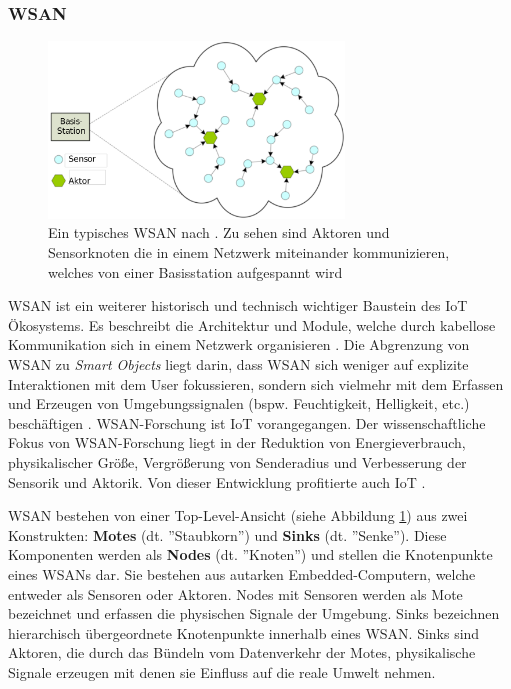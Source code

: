 \subsubsection{\acl{WSAN}}\label{subsubsec:wsan}
\begin{figure}[h]
    \centering
    \includegraphics[width=0.7\textwidth]{bilder/chapter2/wsan.pdf}
    \caption{Ein typisches \ac{WSAN} nach \cite{feng2008wsan}. Zu sehen sind Aktoren und Sensorknoten die in einem Netzwerk miteinander kommunizieren, welches von einer Basisstation aufgespannt wird}
    \label{fig:WSAN}
\end{figure}
\ac{WSAN} ist ein weiterer historisch und technisch wichtiger Baustein des \ac{IoT} Ökosystems. Es beschreibt die Architektur und Module, welche durch kabellose Kommunikation sich in einem Netzwerk organisieren \cite{ferrara2013smart}. Die Abgrenzung von \ac{WSAN} zu \textit{Smart Objects} liegt darin, dass \ac{WSAN} sich weniger auf explizite Interaktionen mit dem User fokussieren, sondern sich vielmehr mit dem Erfassen und Erzeugen von Umgebungssignalen (bspw. Feuchtigkeit, Helligkeit, etc.) beschäftigen \cite{Madakam2015litRev}. \ac{WSAN}-Forschung ist \ac{IoT} vorangegangen. Der wissenschaftliche Fokus von \ac{WSAN}-Forschung liegt in der Reduktion von Energieverbrauch, physikalischer Größe, Vergrößerung von Senderadius und Verbesserung der Sensorik und Aktorik. Von dieser Entwicklung profitierte auch \ac{IoT} \cite{lopez2011taxonomy}.

\ac{WSAN} bestehen von einer Top-Level-Ansicht (siehe Abbildung \ref{fig:WSAN}) aus zwei Konstrukten: \textbf{Motes} (dt. ''Staubkorn'') und \textbf{Sinks} (dt. ''Senke''). Diese Komponenten werden als \textbf{Nodes} (dt. ''Knoten'') und stellen die Knotenpunkte eines \acp{WSAN} dar. Sie bestehen aus autarken Embedded-Computern, welche entweder als Sensoren oder Aktoren. Nodes mit Sensoren werden als Mote bezeichnet \cite{salarian2012coordination} und erfassen die physischen Signale der Umgebung. Sinks bezeichnen hierarchisch übergeordnete Knotenpunkte innerhalb eines \ac{WSAN}. Sinks sind Aktoren, die durch das Bündeln vom Datenverkehr der Motes, physikalische Signale erzeugen mit denen sie Einfluss auf die reale Umwelt nehmen.

